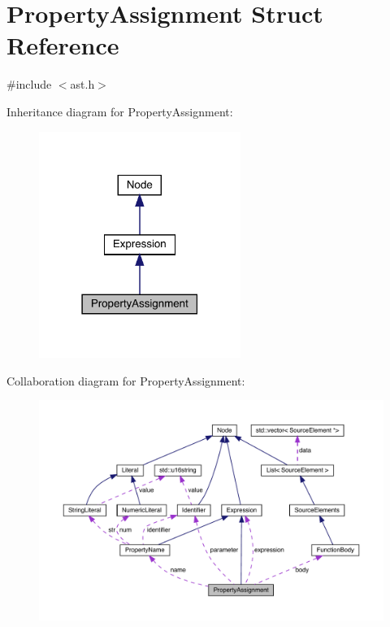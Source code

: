 \hypertarget{struct_property_assignment}{}\section{Property\+Assignment Struct Reference}
\label{struct_property_assignment}


{\ttfamily \#include $<$ast.\+h$>$}



Inheritance diagram for Property\+Assignment\+:\nopagebreak
\begin{figure}[H]
\begin{center}
\leavevmode
\includegraphics[width=186pt]{struct_property_assignment__inherit__graph}
\end{center}
\end{figure}


Collaboration diagram for Property\+Assignment\+:\nopagebreak
\begin{figure}[H]
\begin{center}
\leavevmode
\includegraphics[width=350pt]{struct_property_assignment__coll__graph}
\end{center}
\end{figure}
